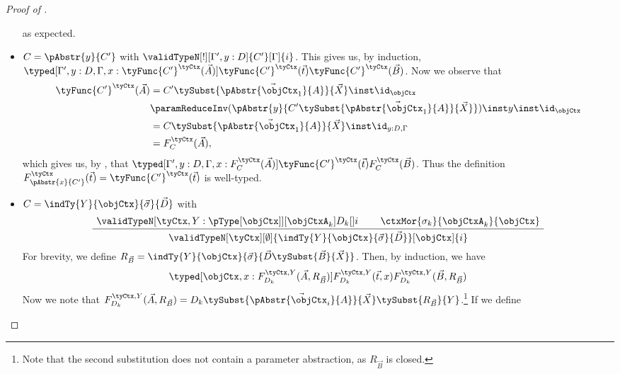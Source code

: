 \documentclass[preprint]{sigplanconf}
\begin{document}
\begin{proof}[Proof of ]
\begin{itemize}
\begin{equation*}
    \end{equation*}
    as expected.
  \item $C = \pAbstr{y}{C'}$ with
    $\validTypeN[!][\Gamma', y : D]{C'}[\Gamma]{i}$.
    This gives us, by induction,
    $\typed[\Gamma', y : D, \Gamma, x : \tyFunc{C'}^\tyCtx(\vec{A})]
    {\tyFunc{C'}^\tyCtx(\vec{t})}{\tyFunc{C'}^\tyCtx(\vec{B})}$.
    Now we observe that
    \begin{align*}
      \tyFunc{C'}^\tyCtx(\vec{A})
      & = C' \tySubst{\vec{\pAbstr{\objCtx_1}{A}}}{\vec{X}} \inst \id_\objCtx \\
      & \paramReduceInv (
      \pAbstr{y}{C' \tySubst{\vec{\pAbstr{\objCtx_1}{A}}}{\vec{X}}})
      \inst y \inst \id_\objCtx \\
      & = C \tySubst{\vec{\pAbstr{\objCtx_1}{A}}}{\vec{X}}
      \inst \id_{y : D, \Gamma} \\
      & = F_{C}^\tyCtx(\vec{A}),
    \end{align*}
    which gives us, by , that
    $\typed[\Gamma', y : D, \Gamma, x : F_{C}^\tyCtx(\vec{A})]
    {\tyFunc{C'}^\tyCtx(\vec{t})}{F_{C}^\tyCtx(\vec{B})}$.
    Thus the definition
    $F_{\pAbstr{x}{C'}}^\tyCtx(\vec{t}) = \tyFunc{C'}^\tyCtx(\vec{t})$ is
    well-typed.
    \vspace*{5pt}
  \item $C = \indTy{Y}{\objCtx}{\vec{\sigma}}{\vec{D}}$ with
    \begin{equation*}
      \AxiomC{$
        \validTypeN[\tyCtx, Y : {\pType[\objCtx]}][\objCtxA_k]
        {D_k}[]{i}$}
      \AxiomC{$\ctxMor{\sigma_k}{\objCtxA_k}{\objCtx}$}
      \BinaryInfC{$
        \validTypeN[\tyCtx][\emptyset]
        {\indTy{Y}{\objCtx}{\vec{\sigma}}{\vec{D}}}[\objCtx]{i}$}
      \DisplayProof
    \end{equation*}
    For brevity, we define
    $R_{\vec{B}} =
    \indTy{Y}{\objCtx}{\vec{\sigma}}{\vec{D} \tySubst{\vec{B}}{\vec{X}}}$.
    Then, by induction, we have
\begin{equation*}
      \typed[\objCtx, x : F_{D_k}^{\tyCtx, Y}(\vec{A}, R_{\vec{B}})]
      {F_{D_k}^{\tyCtx,Y}(\vec{t}, x)}
      {F_{D_k}^{\tyCtx, Y}(\vec{B}, R_{\vec{B}})}
    \end{equation*}
    Now we note that
    $F_{D_k}^{\tyCtx, Y}(\vec{A}, R_{\vec{B}})
    = D_k \tySubst{\vec{\pAbstr{\objCtx_i}{A}}}{
      \vec{X}} \tySubst{R_{\vec{B}}}{Y}$.\footnote{
      Note that the second substitution does not contain a parameter
      abstraction, as $R_{\vec{B}}$ is closed.}
    If we define
    \begin{equation*}

\end{equation*}
\end{itemize}
\end{proof}
\end{document}
